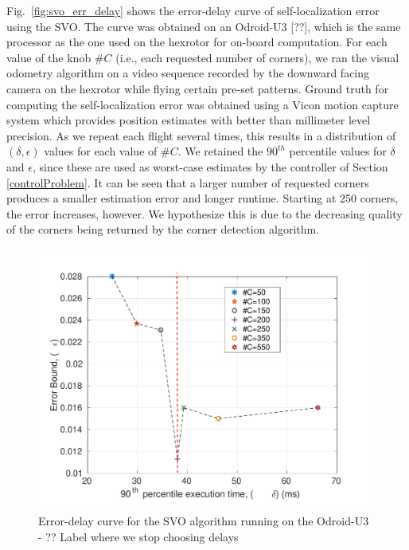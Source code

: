 Fig.~\ref{fig:svo_err_delay} shows the error-delay curve of self-localization error using the SVO.
The curve was obtained on an Odroid-U3 [??], which is the same processor as the one used on the hexrotor for on-board computation.
For each value of the knob $\#C$ (i.e., each requested number of corners), we ran the visual odometry algorithm on a video sequence recorded by the downward facing camera on the hexrotor while flying certain pre-set patterns.
Ground truth for computing the self-localization error was obtained using a Vicon motion capture system which provides position estimates with better than millimeter level precision.
As we repeat each flight several times, this results in a distribution of $(\delta,\epsilon)$ values for each value of $\#C$.
We retained the $90^{th}$ percentile values for $\delta$ and $\epsilon$, since these are used as worst-case estimates by the controller of Section \ref{controlProblem}.
It can be seen that a larger number of requested corners produces a smaller estimation error and longer runtime.
Starting at 250 corners, the error increases, however.
We hypothesize this is due to the decreasing quality of the corners being returned by the corner detection algorithm.
\begin{figure}[t]
\centering
\includegraphics[width=0.9\columnwidth]{figures/errVsTime}
\caption{Error-delay curve for the SVO algorithm running on the Odroid-U3 - ?? Label where we stop choosing delays}
\label{fig:svo_error_delay}
\end{figure}

